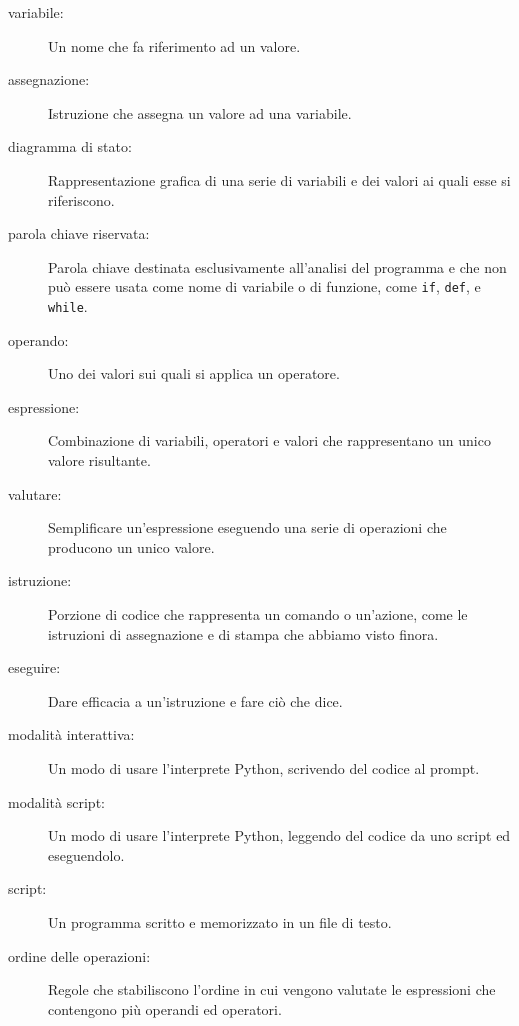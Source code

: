 \documentclass[10pt]{book}
\begin{document}
\begin{description}

\item[variabile:]  Un nome che fa riferimento ad un valore.

\item[assegnazione:]  Istruzione che assegna un valore ad una variabile.

\item[diagramma di stato:]  Rappresentazione grafica di una serie di variabili e dei valori ai quali esse si riferiscono.

\item[parola chiave riservata:]  Parola chiave destinata esclusivamente all'analisi del programma e che non può essere usata come nome di variabile o di funzione, come {\tt if}, {\tt  def}, e {\tt while}.

\item[operando:]  Uno dei valori sui quali si applica un operatore.

\item[espressione:]  Combinazione di variabili, operatori e valori che rappresentano un unico valore risultante.

\item[valutare:]  Semplificare un'espressione eseguendo una serie di operazioni che producono un unico valore.

\item[istruzione:]  Porzione di codice che rappresenta un comando o un'azione, come le istruzioni di assegnazione e di stampa che abbiamo visto finora.

\item[eseguire:]  Dare efficacia a un'istruzione e fare ciò che dice.

\item[modalità interattiva:] Un modo di usare l'interprete Python, scrivendo del codice al prompt.

\item[modalità script:] Un modo di usare l'interprete Python, leggendo del codice da uno script ed eseguendolo.

\item[script:] Un programma scritto e memorizzato in un file di testo.

\item[ordine delle operazioni:]  Regole che stabiliscono l'ordine in cui vengono valutate le espressioni che contengono più operandi ed operatori.


\end{description}
\end{document}

